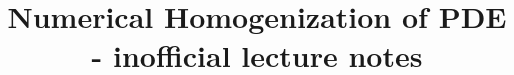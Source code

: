 \documentclass[11pt, USenglish, oneside]{book}
\begin{document}

\begin{titlepage}
 		\title{Numerical Homogenization of PDE - inofficial lecture notes}
\end{titlepage}

\maketitle


\frontmatter
\tableofcontents

\mainmatter
{}


	
	
	
\backmatter
\cleardoublepage
{}
{}


\end{document}
